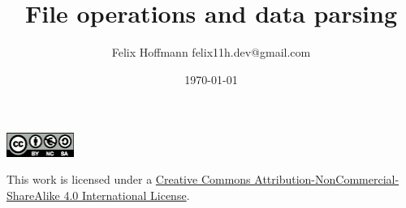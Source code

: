 \documentclass[xcolor=table,10pt]{beamer}
\title {File operations and data parsing}
\author[Felix Hoffmann]{Felix Hoffmann \vspace{0.25cm} \newline \small felix11h.dev@gmail.com}
\institute[]{}
\date{\today}
\begin{document}


\begin{frame} 
  \titlepage
\end{frame}

\begin{frame}
  \begin{center} 

    \vspace{5.95cm}

    \includegraphics[width=2.2cm]{by-nc-sa_eu.eps}

    \vspace{0.25cm}

    \small
    This work is licensed under a
    \href{http://creativecommons.org/licenses/by-nc-sa/4.0/}{Creative
      Commons Attribution-NonCommercial-ShareAlike 4.0 International
      License}.

  \end{center}
\end{frame}










\end{document}
